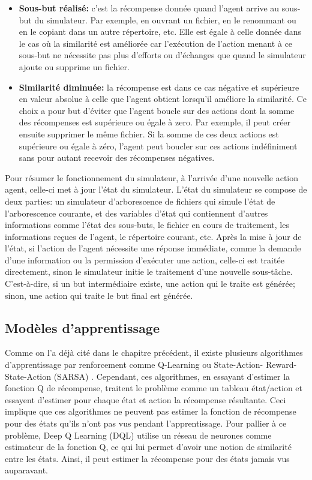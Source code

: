 \begin{itemize}
	\item \textbf{Sous-but réalisé:} c'est la récompense donnée quand l'agent arrive au sous-but du simulateur. Par exemple, en ouvrant un fichier, en le renommant ou en le copiant dans un autre répertoire, etc. Elle est égale à celle donnée dans le cas où la similarité est améliorée car l'exécution de l'action menant à ce sous-but ne nécessite pas plus d'efforts ou d'échanges que quand le simulateur ajoute ou supprime un fichier.
	\item \textbf{Similarité diminuée:} la récompense est dans ce cas négative et supérieure en valeur absolue à celle que l'agent obtient lorsqu'il améliore la similarité. Ce choix a pour but d'éviter que l'agent boucle sur des actions dont la somme des récompenses est supérieure ou égale à zero. Par exemple, il peut créer ensuite supprimer le même fichier. Si la somme de ces deux actions est supérieure ou égale à zéro, l'agent peut boucler sur ces actions indéfiniment sans pour autant recevoir des récompenses négatives.
\end{itemize}
Pour résumer le fonctionnement du simulateur, à l'arrivée d'une nouvelle action agent, celle-ci met à jour l'état du simulateur. L'état du simulateur se compose de deux parties: un simulateur d'arborescence de fichiers qui simule l'état de l'arborescence courante, et des variables d'état qui contiennent d'autres informations comme l'état des sous-buts, le fichier en cours de traitement, les informations reçues de l'agent, le répertoire courant, etc. Après la mise à jour de l'état, si l'action de l'agent nécessite une réponse immédiate, comme la demande d'une information ou la permission d'exécuter une action, celle-ci est traitée directement, sinon le simulateur initie le traitement d'une nouvelle sous-tâche. C'est-à-dire, si un but intermédiaire existe, une action qui le traite est générée; sinon, une action qui traite le but final est générée.
\subsection{Modèles d'apprentissage}\label{DQL}
Comme on l'a déjà cité dans le chapitre précédent, il existe plusieurs algorithmes d'apprentissage par renforcement comme Q-Learning ou State-Action- Reward-State-Action (SARSA) \citep{Rummery1994}. Cependant, ces algorithmes, en essayant d'estimer la fonction Q de récompense, traitent le problème comme un tableau état/action et essayent d'estimer pour chaque état et action la récompense résultante. Ceci implique que ces algorithmes ne peuvent pas estimer la fonction de récompense pour des états qu'ils n'ont pas vus pendant l'apprentissage. Pour pallier à ce problème, Deep Q Learning (DQL)\citep{Mnih2015} utilise un réseau de neurones comme estimateur de la fonction Q, ce qui lui permet d'avoir une notion de similarité entre les états. Ainsi, il peut estimer la récompense pour des états jamais vus auparavant.
